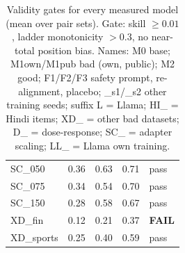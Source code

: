 \begin{table}[h]
\begin{minipage}[t]{0.48\linewidth}
\begin{tabular}{lrrrl}
SC\_050 & 0.36 & 0.63 & 0.71 & pass\\
SC\_075 & 0.34 & 0.54 & 0.70 & pass\\
SC\_150 & 0.28 & 0.58 & 0.67 & pass\\
XD\_fin & 0.12 & 0.21 & 0.37 & \textbf{FAIL}\\
XD\_sports & 0.25 & 0.40 & 0.59 & pass\\
\bottomrule\end{tabular}
\end{minipage}
\caption{Validity gates for every measured model (mean over pair sets). Gate: skill $\ge0.01$, ladder monotonicity $>0.3$, no near-total position bias. Names: M0 base; M1own/M1pub bad (own, public); M2 good; F1/F2/F3 safety prompt, re-alignment, placebo; \_s1/\_s2 other training seeds; suffix L = Llama; HI\_ = Hindi items; XD\_ = other bad datasets; D\_ = dose-response; SC\_ = adapter scaling; LL\_ = Llama own training.}\label{tab:gates}
\end{table}
